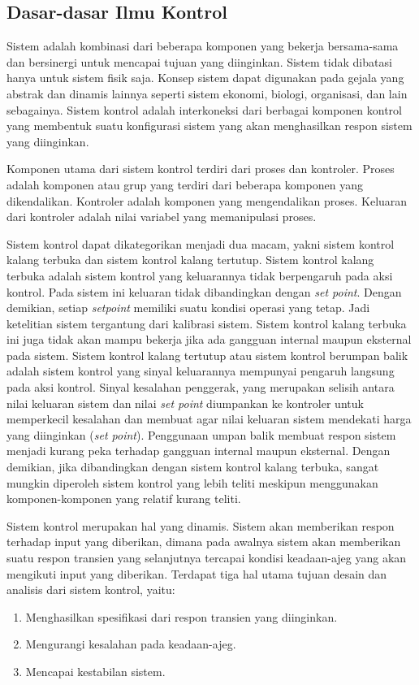 \subsection{Dasar-dasar Ilmu Kontrol}

Sistem adalah kombinasi dari beberapa komponen yang bekerja bersama-sama dan bersinergi untuk mencapai tujuan yang diinginkan. Sistem tidak dibatasi hanya untuk sistem fisik saja. Konsep sistem dapat digunakan pada gejala yang abstrak dan dinamis lainnya seperti sistem ekonomi, biologi, organisasi, dan lain sebagainya. Sistem kontrol adalah interkoneksi dari berbagai komponen kontrol yang membentuk suatu konfigurasi sistem yang akan menghasilkan respon sistem yang diinginkan.

Komponen utama dari sistem kontrol terdiri dari proses dan kontroler. Proses adalah komponen atau grup yang terdiri dari beberapa komponen yang dikendalikan. Kontroler adalah komponen yang mengendalikan proses. Keluaran dari kontroler adalah nilai variabel yang memanipulasi proses.

Sistem kontrol dapat dikategorikan menjadi dua macam, yakni sistem kontrol kalang terbuka dan sistem kontrol kalang tertutup. Sistem kontrol kalang terbuka adalah sistem kontrol yang keluarannya tidak berpengaruh pada aksi kontrol. Pada sistem ini keluaran tidak dibandingkan dengan \textit{set point}. Dengan demikian, setiap \textit{setpoint} memiliki suatu kondisi operasi yang tetap. Jadi ketelitian sistem tergantung dari kalibrasi sistem. Sistem kontrol kalang terbuka ini juga tidak akan mampu bekerja jika ada gangguan internal maupun eksternal pada sistem. Sistem kontrol kalang tertutup atau sistem kontrol berumpan balik adalah sistem kontrol yang sinyal keluarannya mempunyai pengaruh langsung pada aksi kontrol. Sinyal kesalahan penggerak, yang merupakan selisih antara nilai keluaran sistem dan nilai \textit{set point} diumpankan ke kontroler untuk memperkecil kesalahan dan membuat agar nilai keluaran sistem mendekati harga yang diinginkan (\textit{set point}). Penggunaan umpan balik membuat respon sistem menjadi kurang peka terhadap gangguan internal maupun eksternal. Dengan demikian, jika dibandingkan dengan sistem kontrol kalang terbuka, sangat mungkin diperoleh sistem kontrol yang lebih teliti meskipun menggunakan komponen-komponen yang relatif kurang teliti. \cite{ControlSystemBook}

Sistem kontrol merupakan hal yang dinamis. Sistem akan memberikan respon terhadap input yang diberikan, dimana pada awalnya sistem akan memberikan suatu respon transien yang selanjutnya tercapai kondisi keadaan-ajeg yang akan mengikuti input yang diberikan. Terdapat tiga hal utama tujuan desain dan analisis dari sistem kontrol, yaitu: \cite{ControlSystemBook}
\begin{enumerate}
	\item Menghasilkan spesifikasi dari respon transien yang diinginkan.
	\item Mengurangi kesalahan pada keadaan-ajeg.
	\item Mencapai kestabilan sistem.
\end{enumerate}

